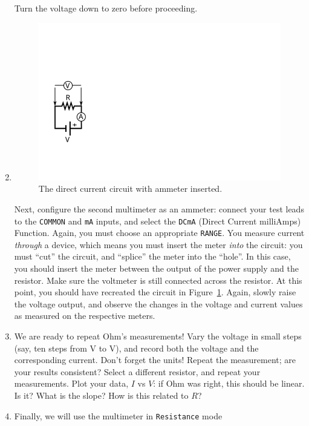 \documentclass[12pt]{article}
\begin{document}
\begin{enumerate}
  Turn the voltage down to zero before proceeding.
\item 
  \begin{figure}
    \centering
    \includegraphics[width=\textwidth/5]{figures/simplest_with_ammeter}
    \caption{The direct current circuit with ammeter inserted.}
    \label{fig:simplest_with_ammeter}
  \end{figure}
  Next, configure the second multimeter as an ammeter: connect your
  test leads to the \texttt{COMMON} and \texttt{mA} inputs, and select
  the \texttt{DCmA} (Direct Current milliAmps) Function.  Again, you
  must choose an appropriate \texttt{RANGE}.  You measure current
  \textit{through} a device, which means you must insert the meter
  \textit{into} the circuit: you must ``cut'' the circuit, and
  ``splice'' the meter into the ``hole''.  In this case, you should
  insert the meter between the output of the power supply and the
  resistor.  Make sure the voltmeter is still connected across the
  resistor.  At this point, you should have recreated the circuit in
  Figure~\ref{fig:simplest_with_ammeter}.  Again, slowly raise the
  voltage output, and observe the changes in the voltage and current
  values as measured on the respective meters.
\item We are ready to repeat Ohm's measurements!  Vary the voltage in
  small steps (say, ten steps from \unit[0]{V} to \unit[10]{V}), and
  record both the voltage and the corresponding current.  Don't forget
  the units!  Repeat the measurement; are your results consistent?
  Select a different resistor, and repeat your measurements.  Plot
  your data, $I$ vs $V$: if Ohm was right, this should be linear.  Is
  it?  What is the slope?  How is this related to $R$?
\item Finally, we will use the multimeter in \texttt{Resistance} mode

\end{enumerate}
\end{document}
